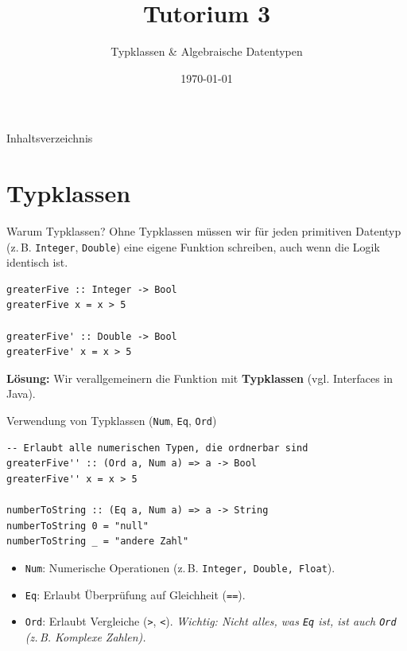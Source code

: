 \documentclass[aspectratio=169,11pt]{beamer}
\title{\textbf{Tutorium 3}}
\subtitle{Typklassen \& Algebraische Datentypen}
\institute{Grundlagen der Praktischen Informatik}
\author{}
\date{\today}
\begin{document}
\begin{frame}[plain]
    \titlepage
\end{frame}

\begin{frame}{Inhaltsverzeichnis}
    \tableofcontents
\end{frame}

\section{Typklassen}

\begin{frame}[fragile]{Warum Typklassen?}
    Ohne Typklassen müssen wir für jeden primitiven Datentyp (z.\,B. \texttt{Integer}, \texttt{Double}) eine eigene Funktion schreiben, auch wenn die Logik identisch ist.
    
    \begin{tcolorbox}[alertbox, title=Das Problem]
\begin{lstlisting}
greaterFive :: Integer -> Bool
greaterFive x = x > 5

greaterFive' :: Double -> Bool
greaterFive' x = x > 5
\end{lstlisting}
    \end{tcolorbox}
    \textbf{Lösung:} Wir verallgemeinern die Funktion mit \textbf{Typklassen} (vgl. Interfaces in Java).
\end{frame}

\begin{frame}[fragile]{Verwendung von Typklassen (\texttt{Num}, \texttt{Eq}, \texttt{Ord})}
    \begin{tcolorbox}[successbox, title=Die Lösung mit Typklassen]
\begin{lstlisting}
-- Erlaubt alle numerischen Typen, die ordnerbar sind
greaterFive'' :: (Ord a, Num a) => a -> Bool
greaterFive'' x = x > 5

numberToString :: (Eq a, Num a) => a -> String
numberToString 0 = "null"
numberToString _ = "andere Zahl"
\end{lstlisting}
    \end{tcolorbox}
    
    \begin{itemize}
        \item \texttt{Num}: Numerische Operationen (z.\,B. \texttt{Integer, Double, Float}).
        \item \texttt{Eq}: Erlaubt Überprüfung auf Gleichheit (\texttt{==}).
        \item \texttt{Ord}: Erlaubt Vergleiche (\texttt{>}, \texttt{<}). \textit{Wichtig: Nicht alles, was \texttt{Eq} ist, ist auch \texttt{Ord} (z.\,B. Komplexe Zahlen).}
    \end{itemize}
\end{frame}
\end{document}
